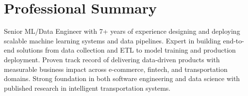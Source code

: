 \documentclass[12pt, a4paper, sans]{moderncv}
\begin{document}
\maketitle

\section{Professional Summary}
Senior ML/Data Engineer with 7+ years of experience designing and deploying scalable machine learning systems and data pipelines. Expert in building end-to-end solutions from data collection and ETL to model training and production deployment. Proven track record of delivering data-driven products with measurable business impact across e-commerce, fintech, and transportation domains. Strong foundation in both software engineering and data science with published research in intelligent transportation systems.





\end{document}

